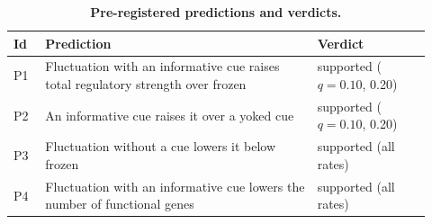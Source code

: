\documentclass[10pt,letterpaper]{article}
\begin{document}
\begin{table}[!ht]
\centering
\caption{{\bf Pre-registered predictions and verdicts.}}
\small
\begin{tabular}{@{}p{0.07\linewidth}p{0.6\linewidth}p{0.25\linewidth}@{}}
\toprule
Id & Prediction & Verdict \\
\midrule
P1 & Fluctuation with an informative cue raises total regulatory strength over frozen & supported ($q=0.10$, 0.20) \\
P2 & An informative cue raises it over a yoked cue & supported ($q=0.10$, 0.20) \\
P3 & Fluctuation without a cue lowers it below frozen & supported (all rates) \\
P4 & Fluctuation with an informative cue lowers the number of functional genes & supported (all rates) \\


\end{tabular}
\end{table}
\end{document}
